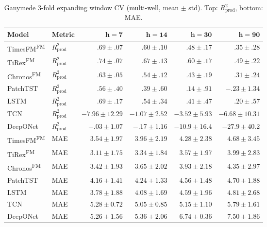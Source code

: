 \documentclass[11pt]{article}
\newcommand{\fm}{\textsuperscript{FM}}
\newcommand{\rp}{R^2_\text{prod}}
\begin{document}
\begin{table}[ht]
\centering
\caption{Ganymede 3-fold expanding window CV (multi-well, mean $\pm$ std). Top: $\rp$, bottom: MAE.}
\label{tab:ganymede_cv}
\scriptsize
\setlength{\tabcolsep}{2.5pt}
\begin{tabular}{@{}ll rrrr @{}}
\toprule
\textbf{Model} & \textbf{Metric} & $\boldsymbol{h{=}7}$ & $\boldsymbol{h{=}14}$ & $\boldsymbol{h{=}30}$ & $\boldsymbol{h{=}90}$ \\
\midrule
TimesFM\fm  & $\rp$ & $.69 \pm .07$ & $.60 \pm .10$ & $.48 \pm .17$ & $.35 \pm .28$ \\
TiRex\fm    & $\rp$ & $.74 \pm .07$ & $.67 \pm .13$ & $.60 \pm .17$ & $.49 \pm .22$ \\
Chronos\fm  & $\rp$ & $.63 \pm .05$ & $.54 \pm .12$ & $.43 \pm .19$ & $.31 \pm .24$ \\
PatchTST    & $\rp$ & $.56 \pm .40$ & $.39 \pm .60$ & $.14 \pm .91$ & $-.23 \pm 1.34$ \\
LSTM        & $\rp$ & $.69 \pm .17$ & $.54 \pm .34$ & $.41 \pm .47$ & $.20 \pm .57$ \\
TCN         & $\rp$ & $-7.96 \pm 12.29$ & $-1.07 \pm 2.52$ & $-3.52 \pm 5.93$ & $-6.68 \pm 10.31$ \\
DeepONet    & $\rp$ & $-.03 \pm 1.07$ & $-.17 \pm 1.16$ & $-10.9 \pm 16.4$ & $-27.9 \pm 40.2$ \\
\midrule
TimesFM\fm  & MAE & $3.54 \pm 1.97$ & $3.96 \pm 2.19$ & $4.28 \pm 2.38$ & $4.68 \pm 3.45$ \\
TiRex\fm    & MAE & $3.11 \pm 1.75$ & $3.34 \pm 1.84$ & $3.57 \pm 1.97$ & $3.99 \pm 2.83$ \\
Chronos\fm  & MAE & $3.42 \pm 1.93$ & $3.65 \pm 2.02$ & $3.93 \pm 2.18$ & $4.35 \pm 2.97$ \\
PatchTST    & MAE & $4.16 \pm 1.41$ & $4.24 \pm 1.33$ & $4.56 \pm 1.48$ & $4.70 \pm 1.88$ \\
LSTM        & MAE & $3.78 \pm 1.88$ & $4.08 \pm 1.69$ & $4.59 \pm 1.96$ & $4.81 \pm 2.68$ \\
TCN         & MAE & $5.28 \pm 0.72$ & $5.05 \pm 0.85$ & $5.15 \pm 1.10$ & $5.79 \pm 1.61$ \\
DeepONet    & MAE & $5.26 \pm 1.56$ & $5.36 \pm 2.06$ & $6.74 \pm 0.36$ & $7.50 \pm 1.86$ \\
\bottomrule
\end{tabular}
\end{table}
\end{document}
